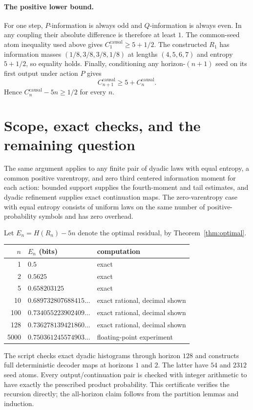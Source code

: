 \documentclass[11pt,a4paper]{article}
\begin{document}
\paragraph{The positive lower bound.}
For one step, $P$-information is always odd and $Q$-information is always
even. In any coupling their absolute difference is therefore at least
$1$. The common-seed atom inequality used above gives
$C_1^{\mathrm{causal}}\ge5+1/2$.
The constructed $R_1$ has information masses
$(1/8,3/8,3/8,1/8)$ at lengths $(4,5,6,7)$ and entropy $5+1/2$,
so equality holds. Finally, conditioning any horizon-$(n+1)$ seed on
its first output under action $P$ gives
\[
C_{n+1}^{\mathrm{causal}}\ge5+C_n^{\mathrm{causal}}.
\]
Hence $C_n^{\mathrm{causal}}-5n\ge1/2$ for every $n$.

\section{Scope, exact checks, and the remaining question}
The same argument applies to any finite pair of dyadic laws with equal
entropy, a common positive varentropy, and zero third centered information
moment for each action: bounded support supplies the fourth-moment and
tail estimates, and dyadic refinement supplies exact continuation maps.
The zero-varentropy case with equal entropy consists of uniform laws on
the same number of positive-probability symbols and has zero overhead.

Let $E_n=H(R_n)-5n$ denote the optimal residual, by
Theorem~\ref{thm:optimal}.
\begin{center}
\begin{tabular}{rll}
\toprule
$n$ & $E_n$ (bits) & computation\\
\midrule
1 & $0.5$ & exact\\
2 & $0.5625$ & exact\\
5 & $0.658203125$ & exact\\
10 & $0.689732807688415\ldots$ & exact rational, decimal shown\\
100 & $0.734055223902409\ldots$ & exact rational, decimal shown\\
128 & $0.736278139421860\ldots$ & exact rational, decimal shown\\
5000 & $0.750361245574903\ldots$ & floating-point experiment\\
\bottomrule
\end{tabular}
\end{center}
The script checks exact dyadic histograms through horizon $128$ and
constructs full deterministic decoder maps at horizons $1$ and $2$.
The latter have $54$ and $2312$ seed atoms. Every output/continuation
pair is checked with integer arithmetic to have exactly the prescribed
product probability. This certificate verifies the recursion directly;
the all-horizon claim follows from the partition lemmas and induction.
\end{document}
